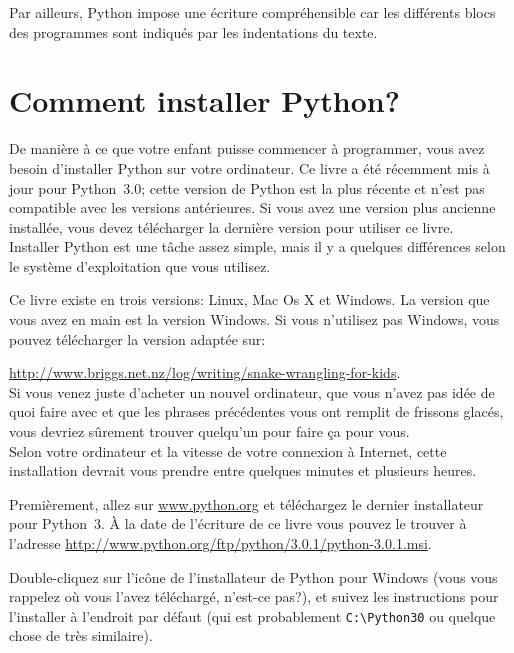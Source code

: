 Par ailleurs, Python impose une écriture compréhensible car les différents blocs des programmes sont indiqués par les indentations du texte.

\bigskip
\section*{Comment installer Python?}
De manière à ce que votre enfant puisse commencer à programmer, vous avez besoin 
d'installer Python sur votre ordinateur. Ce livre a été récemment mis à jour pour Python~3.0; cette version de Python est la plus récente et n'est pas compatible avec les versions antérieures. Si vous avez une
version plus ancienne installée, vous devez télécharger la dernière version pour utiliser ce livre.\\


Installer Python est une tâche assez simple, mais il y a quelques différences selon le système d'exploitation que 
vous utilisez. 

Ce livre existe en trois versions: Linux, Mac Os X et Windows. La version que vous avez en main est la version Windows. Si vous n'utilisez pas Windows, vous pouvez télécharger la version adaptée sur:

\url{http://www.briggs.net.nz/log/writing/snake-wrangling-for-kids}.\\



Si vous venez juste d'acheter un nouvel ordinateur, que vous n'avez pas idée de quoi faire avec et que les phrases précédentes vous ont remplit de frissons glacés, vous devriez sûrement trouver quelqu'un pour faire ça pour vous.\\


Selon votre ordinateur et la vitesse de votre connexion à Internet, cette installation devrait vous prendre entre quelques minutes et plusieurs heures.

Premièrement, allez sur \url{www.python.org} et téléchargez le dernier installateur pour Python~3. À la date de l'écriture de ce livre vous pouvez le trouver à l'adresse  \url{http://www.python.org/ftp/python/3.0.1/python-3.0.1.msi}.

Double-cliquez sur l'icône de l'installateur de Python pour Windows (vous vous rappelez où vous l'avez téléchargé, n'est-ce pas?), et suivez les instructions pour l'installer à l'endroit par défaut (qui est probablement \verb+C:\Python30+ ou quelque chose de très similaire).\\


